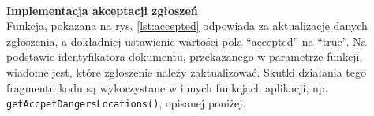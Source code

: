 \noindent
\setlength{\fboxrule}{0.5pt}
\begin{minipage}{\linewidth}
    \label{lst:danger}
    \centering
\end{minipage}
\\

\noindent
\textbf{Implementacja akceptacji zgłoszeń} \\ 
\indent Funkcja, pokazana na rys. \ref{lst:accepted} odpowiada za aktualizację danych zgłoszenia, a dokładniej ustawienie wartości pola “accepted” na “true”. Na podstawie identyfikatora dokumentu, przekazanego w parametrze funkcji, wiadome jest, które zgłoszenie należy zaktualizować. Skutki działania tego fragmentu kodu są wykorzystane w innych funkcjach aplikacji, np. \verb|getAccpetDangersLocations()|, opisanej poniżej.

\noindent
\setlength{\fboxrule}{0.5pt}
\begin{minipage}{\linewidth}
    \label{lst:accepted}
    \centering
\end{minipage}
\\

